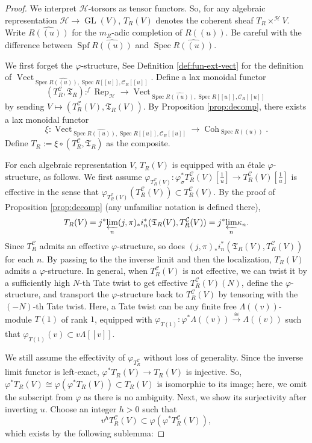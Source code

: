 \documentclass[11pt]{amsart}
\numberwithin{thm}{section}
\numberwithin{lem}{section}
\numberwithin{cor}{section}
\numberwithin{prop}{section}
\numberwithin{exam}{section}
\numberwithin{dfn}{section}
\newcommand{\wh}[1]{\widehat{#1}}
\newcommand{\frep}{^f\operatorname{Rep}}
\newcommand{\GL}{\operatorname{GL}}
\newcommand{\Vect}{\operatorname{Vect}}
\newcommand{\Coh}{\operatorname{Coh}}
\newcommand{\spf}{\operatorname{Spf}}
\newcommand{\spec}{\operatorname{Spec}}
\newcommand{\invlim}[1]{{\varprojlim_{#1}}}
\newcommand{\cK}{\mathcal{K}}
\newcommand{\cC}{\mathcal{C}}
\newcommand{\fT}{\mathfrak{T}}
\newcommand{\cF}{\mathcal{F}}
\newcommand{\clH}{\mathcal{H}}
\begin{document}
\begin{proof}
We interpret
$\clH$-torsors as tensor functors.
So, for any algebraic representation
$\clH\to \GL(V)$,
$T_R(V)$
denotes the coherent sheaf
$T_R\times^{\clH}V$.
Write $\wh{R(\!(u)\!)}$
for the $m_R$-adic completion of $R(\!(u)\!)$.
Be careful with the difference between
$\spf \wh{R(\!(u)\!)}$
and $\spec \wh{R(\!(u)\!)}$.

We first forget the $\varphi$-structure,
See Definition \ref{def:fun-ext-vect}
for the definition of 
$\Vect_{\spec \wh {R(\!(u)\!)}, \spec R[\![u]\!], \cC_{R}[\![u]\!]}$.
Define a lax monoidal functor 
\[
(T_R^\cC, \fT_R): \frep_{\clH}\to \Vect_{\spec \wh {R(\!(u)\!)}, \spec R[\![u]\!], \cC_{R}[\![u]\!]}
\]
by sending $V \mapsto (T_R^\cC(V), \fT_R(V))$.
By Proposition \ref{prop:decomp},
there exists a lax monoidal functor
\[
\xi: \Vect_{\spec \wh {R(\!(u)\!)}, \spec R[\![u]\!], 
\cC_{R}[\![u]\!]}\to \Coh_{\spec R(\!(u)\!)}.
\]
Define $T_R:=\xi\circ (T_R^\cC, \fT_R)$
as the composite.

For each algebraic representation $V$, $T_R(V)$ is equipped with an \'etale $\varphi$-structure, as follows.
We first assume 
$\varphi_{T_R^\cC(V)}: \varphi_\sigma^*T_R^\cC(V)[\frac{1}{u}]\to T_R^\cC(V)[\frac{1}{u}]$
is effective in the sense that
$\varphi_{T_R^\cC(V)}(T_R^\cC(V))\subset
T_R^\cC(V)$.
By the proof of Proposition \ref{prop:decomp}
(any unfamiliar notation is defined there),
\[
T_R(V)=j^*\invlim{n} (j, \pi)_*i_n^*(\fT_R(V), T_R^\cC(V))
=j^*\invlim{n}\kappa_n.
\]
Since $T_R^\cC$ admits an effective $\varphi$-structure,
so does $(j, \pi)_*i_n^*(\fT_R(V), T_R^\cC(V))$ for each $n$.
By passing to the the inverse limit and then the localization,
$T_R(V)$ admits a $\varphi$-structure.
In general,
when $T_R^\cC(V)$
is not effective,
we can twist it by a sufficiently high $N$-th Tate twist
to get
effective $T_R^\cC(V)(N)$,
define the $\varphi$-structure,
and transport the $\varphi$-structure
back to $T_R^\cC(V)$
by tensoring with the $(-N)$-th Tate twist.
Here, a Tate twist
can be any finite free $\Lambda(\!(v)\!)$-module
$T(1)$
of rank $1$,
equipped with
$\varphi_{T(1)}:\varphi^*\Lambda(\!(v)\!)\xrightarrow{\cong} \Lambda(\!(v)\!)$
such that $\varphi_{T(1)}(v)\subset v\Lambda[\![v]\!]$.

We still assume the effectivity of $\varphi_{T_R^\cC}$
without loss of generality.
Since the inverse limit functor is left-exact,
$\varphi^* T_R(V)\to T_R(V)$ is injective.
So, $\varphi^* T_R(V)\cong
\varphi(\varphi^* T_R(V))\subset
T_R(V)$ is isomorphic to its image;
here, we omit the subscript from $\varphi$
as there is no ambiguity.
Next, we show its surjectivity
after inverting $u$.
Choose an integer $h>0$ such that
\[
v^hT_R^\cC(V) \subset \varphi(\varphi^*T_R^\cC(V)),
\]
which exists by the following sublemma:


\end{proof}
\end{document}
